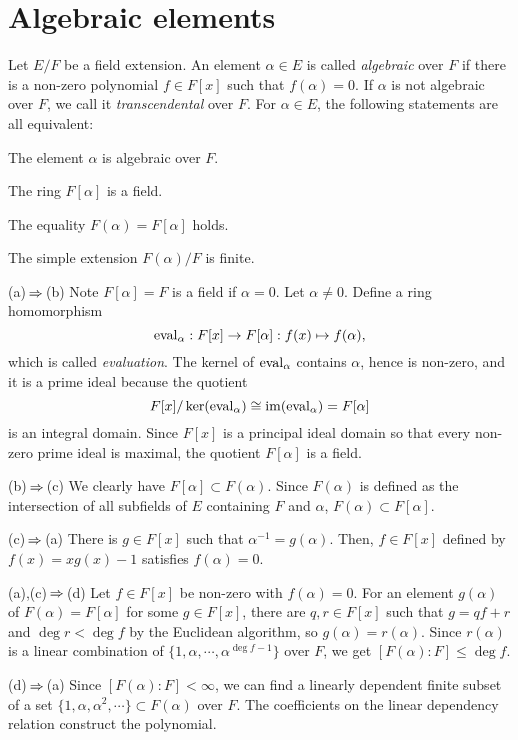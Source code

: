 \documentclass{../../large}
\begin{document}
\section{Algebraic elements}
\begin{prb}
Let $E/F$ be a field extension.
An element $\alpha\in E$ is called \emph{algebraic} over $F$ if there is a non-zero polynomial $f\in F[x]$ such that $f(\alpha)=0$.
If $\alpha$ is not algebraic over $F$, we call it \emph{transcendental} over $F$.
For $\alpha\in E$, the following statements are all equivalent:
\begin{parts}
\item The element $\alpha$ is algebraic over $F$.
\item The ring $F[\alpha]$ is a field.
\item The equality $F(\alpha)=F[\alpha]$ holds.
\item The simple extension $F(\alpha)/F$ is finite.
\end{parts}
\end{prb}
\begin{pf}
(a)$\impl$(b)
Note $F[\alpha]=F$ is a field if $\alpha=0$.
Let $\alpha\ne0$.
Define a ring homomorphism
\[\operatorname{eval}_\alpha:F[x]\to F[\alpha]:f(x)\mapsto f(\alpha),\]
which is called \emph{evaluation}.
The kernel of $\operatorname{eval}_\alpha$ contains $\alpha$, hence is non-zero, and it is a prime ideal because the quotient
\[F[x]/\ker(\operatorname{eval}_\alpha)\cong\operatorname{im}(\operatorname{eval}_\alpha)=F[\alpha]\]
is an integral domain.
Since $F[x]$ is a principal ideal domain so that every non-zero prime ideal is maximal, the quotient $F[\alpha]$ is a field.

(b)$\impl$(c)
We clearly have $F[\alpha]\subset F(\alpha)$.
Since $F(\alpha)$ is defined as the intersection of all subfields of $E$ containing $F$ and $\alpha$, $F(\alpha)\subset F[\alpha]$.

(c)$\impl$(a)
There is $g\in F[x]$ such that $\alpha^{-1}=g(\alpha)$.
Then, $f\in F[x]$ defined by $f(x)=xg(x)-1$ satisfies $f(\alpha)=0$.

(a),(c)$\impl$(d)
Let $f\in F[x]$ be non-zero with $f(\alpha)=0$.
For an element $g(\alpha)$ of $F(\alpha)=F[\alpha]$ for some $g\in F[x]$, there are $q,r\in F[x]$ such that $g=qf+r$ and $\deg r<\deg f$ by the Euclidean algorithm, so $g(\alpha)=r(\alpha)$.
Since $r(\alpha)$ is a linear combination of $\{1,\alpha,\cdots,\alpha^{\deg f-1}\}$ over $F$, we get $[F(\alpha):F]\le\deg f$.

(d)$\impl$(a)
Since $[F(\alpha):F]<\infty$, we can find a linearly dependent finite subset of a set $\{1,\alpha,\alpha^2,\cdots\}\subset F(\alpha)$ over $F$.
The coefficients on the linear dependency relation construct the polynomial.
\end{pf}
\end{document}
